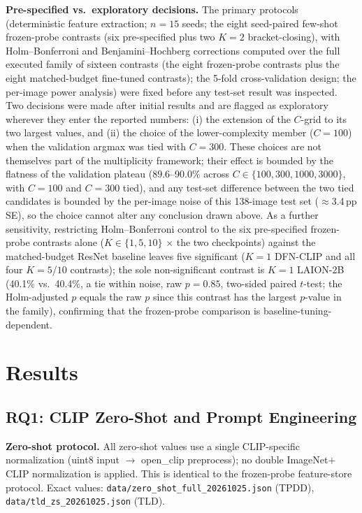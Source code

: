 \documentclass[10pt,a4paper]{article}
\begin{document}
\textbf{Pre-specified vs.\ exploratory decisions.} The primary protocols (deterministic feature extraction; $n=15$ seeds; the eight seed-paired few-shot frozen-probe contrasts (six pre-specified plus two $K{=}2$ bracket-closing), with Holm--Bonferroni and Benjamini--Hochberg corrections computed over the full executed family of sixteen contrasts (the eight frozen-probe contrasts plus the eight matched-budget fine-tuned contrasts); the 5-fold cross-validation design; the per-image power analysis) were fixed before any test-set result was inspected. Two decisions were made after initial results and are flagged as exploratory wherever they enter the reported numbers: (i) the extension of the $C$-grid to its two largest values, and (ii) the choice of the lower-complexity member ($C{=}100$) when the validation argmax was tied with $C{=}300$. These choices are not themselves part of the multiplicity framework; their effect is bounded by the flatness of the validation plateau (89.6--90.0\% across $C\in\{100,300,1000,3000\}$, with $C{=}100$ and $C{=}300$ tied), and any test-set difference between the two tied candidates is bounded by the per-image noise of this 138-image test set ($\approx$3.4\,pp SE), so the choice cannot alter any conclusion drawn above. As a further sensitivity, restricting Holm--Bonferroni control to the six pre-specified frozen-probe contrasts alone ($K\in\{1,5,10\}$ $\times$ the two checkpoints) against the matched-budget ResNet baseline leaves five significant ($K{=}1$ DFN-CLIP and all four $K{=}5$/$10$ contrasts); the sole non-significant contrast is $K{=}1$ LAION-2B (40.1\% vs.\ 40.4\%, a tie within noise, raw $p=0.85$, two-sided paired $t$-test; the Holm-adjusted $p$ equals the raw $p$ since this contrast has the largest $p$-value in the family), confirming that the frozen-probe comparison is baseline-tuning-dependent.

\section{Results}
\label{sec:results}

\subsection{RQ1: CLIP Zero-Shot and Prompt Engineering}

\noindent\textbf{Zero-shot protocol.} All zero-shot values use a single CLIP-specific normalization (uint8 input $\to$ open\_clip preprocess); no double ImageNet$+$CLIP normalization is applied. This is identical to the frozen-probe feature-store protocol. Exact values: \texttt{data/zero\_shot\_full\_20261025.json} (TPDD), \texttt{data/tld\_zs\_20261025.json} (TLD).
\end{document}
